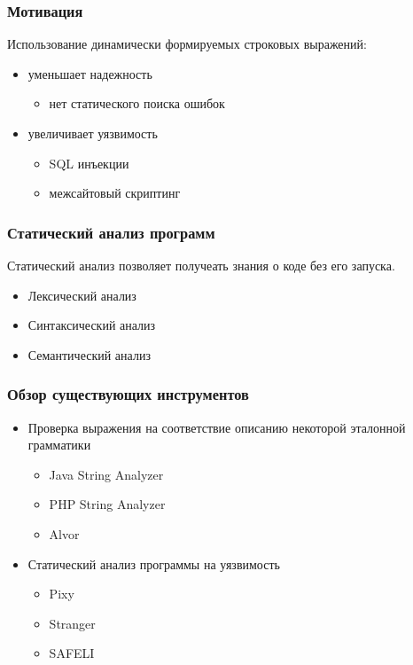 \documentclass{beamer}
\begin{document}
\begin{frame}
\transwipe[direction=90]
\frametitle{Мотивация}
Использование динамически формируемых строковых выражений:
\begin{itemize}
\item уменьшает надежность
\begin{itemize}
\item нет статического поиска ошибок
\end{itemize}
\item увеличивает уязвимость
\begin{itemize}
\item SQL инъекции
\item межсайтовый скриптинг
\end{itemize}
\end{itemize}
\end{frame}


\begin{frame}
\transwipe[direction=90]
\frametitle{Статический анализ программ}
Статический анализ позволяет получеать знания о коде без его запуска.
\begin{itemize}
\item Лексический анализ
\item Синтаксический анализ 
\item Семантический анализ
\end{itemize}

\end{frame}


\begin{frame}
\transwipe[direction=90]
\frametitle{Обзор существующих инструментов}
\begin{itemize}
\item Проверка выражения на соответствие описанию некоторой эталонной грамматики
\begin{itemize}
\item Java String Analyzer
\item PHP String Analyzer
\item Alvor
\end{itemize}

\item Статический анализ программы на уязвимость
\begin{itemize}
\item Pixy
\item Stranger
\item SAFELI
\end{itemize}
\end{itemize}
\end{frame}
\end{document}
